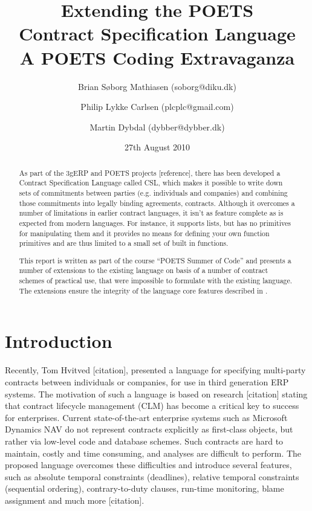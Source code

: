 \documentclass[10pt,a4paper,final,oneside,openany,article]{memoir}
\title{Extending the POETS \\ Contract Specification Language\\
       \vspace{0.1cm}
        \small{A POETS Coding Extravaganza}}
\author{Brian Søborg Mathiasen (soborg@diku.dk) \and
        Philip Lykke Carlsen (plcplc@gmail.com) \and
        Martin Dybdal (dybber@dybber.dk)}
\date{27th August 2010}
\begin{document}
\maketitle

\begin{abstract}
  As part of the 3gERP and POETS projects [reference], there has been
  developed a Contract Specification Language called CSL, which makes
  it possible to write down sets of commitments between parties
  (e.g. individuals and companies) and combining those commitments
  into legally binding agreements, contracts. Although it overcomes a
  number of limitations in earlier contract languages, it isn't as
  feature complete as is expected from modern languages. For instance,
  it supports lists, but has no primitives for manipulating them and
  it provides no means for defining your own function primitives and
  are thus limited to a small set of built in functions.

  This report is written as part of the course "`POETS Summer of
  Code"' and presents a number of extensions to the existing language
  on basis of a number of contract schemes of practical use, that were
  impossible to formulate with the existing language. The extensions
  ensure the integrity of the language core features described in
  \cite{hvitved10}.
\end{abstract}

\listoffixmes


\newpage
\chapter{Introduction}
Recently, Tom Hvitved [citation], presented a language for specifying
multi-party contracts between individuals or companies, for use in third
generation ERP systems. The motivation of such a language is based on
research [citation] stating that contract lifecycle management (CLM) has
become a critical key to success for enterprises. Current
state-of-the-art enterprise systems such as Microsoft Dynamics NAV do
not represent contracts explicitly as first-class objects, but rather
via low-level code and database schemes. Such contracts are hard to
maintain, costly and time consuming, and analyses are difficult to
perform. The proposed language overcomes these difficulties and
introduce several features, such as absolute temporal constraints
(deadlines), relative temporal constraints (sequential ordering),
contrary-to-duty clauses, run-time monitoring, blame assignment and much
more [citation].
\end{document}

